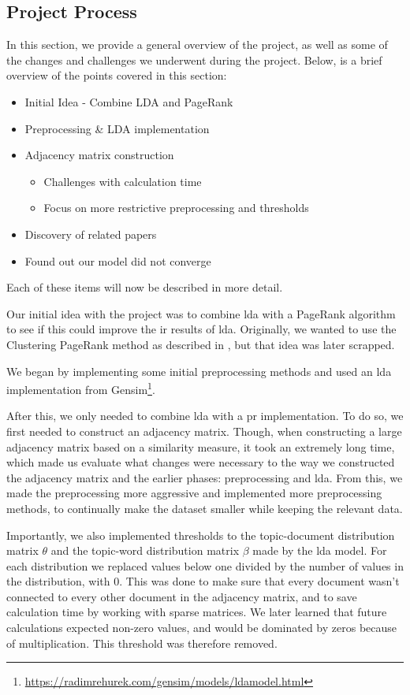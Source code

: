 \subsection{Project Process}
In this section, we provide a general overview of the project, as well as some of the changes and challenges we underwent during the project.
Below, is a brief overview of the points covered in this section:

\begin{itemize}
	\item Initial Idea - Combine LDA and PageRank
	\item Preprocessing \& LDA implementation
	\item Adjacency matrix construction
	\begin{itemize}
		\item Challenges with calculation time
		\item Focus on more restrictive preprocessing and thresholds
	\end{itemize}
	\item Discovery of related papers
	\item Found out our model did not converge
\end{itemize}

Each of these items will now be described in more detail.

Our initial idea with the project was to combine \gls{lda} with a PageRank algorithm to see if this could improve the \acrlong{ir} results of \gls{lda}.
Originally, we wanted to use the Clustering PageRank method as described in \citet{ClusterPageRank}, but that idea was later scrapped.

We began by implementing some initial preprocessing methods and used an \gls{lda} implementation from Gensim\footnote{\url{https://radimrehurek.com/gensim/models/ldamodel.html}}.

After this, we only needed to combine \gls{lda} with a \gls{pr} implementation. 
To do so, we first needed to construct an adjacency matrix.
Though, when constructing a large adjacency matrix based on a similarity measure, it took an extremely long time, which made us evaluate what changes were necessary to the way we constructed the adjacency matrix and the earlier phases: preprocessing and \gls{lda}.
From this, we made the preprocessing more aggressive and implemented more preprocessing methods, to continually make the dataset smaller while keeping the relevant data.

Importantly, we also implemented thresholds to the topic-document distribution matrix $\theta$ and the topic-word distribution matrix $\beta$ made by the \gls{lda} model.
For each distribution we replaced values below one divided by the number of values in the distribution, with 0.
This was done to make sure that every document wasn't connected to every other document in the adjacency matrix, and to save calculation time by working with sparse matrices.
We later learned that future calculations expected non-zero values, and would be dominated by zeros because of multiplication.
This threshold was therefore removed.

